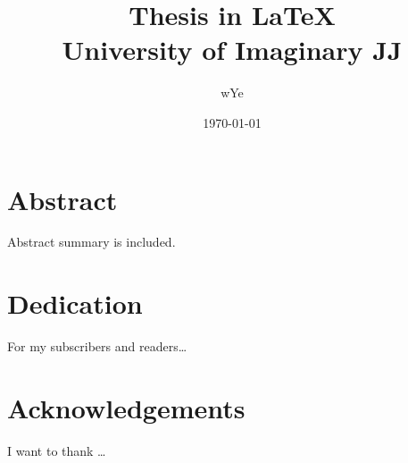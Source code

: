 \documentclass[a4paper, 11pt]{report}
\title{Thesis in \LaTeX \\
{\Large University of Imaginary JJ}}
\author{wYe}
\date{\today}
\begin{document}
    \maketitle

    \chapter*{Abstract}
    Abstract summary is included.
    \chapter*{Dedication}
    For my subscribers and readers\dots
    \chapter*{Acknowledgements}
    I want to thank \dots
\end{document}
